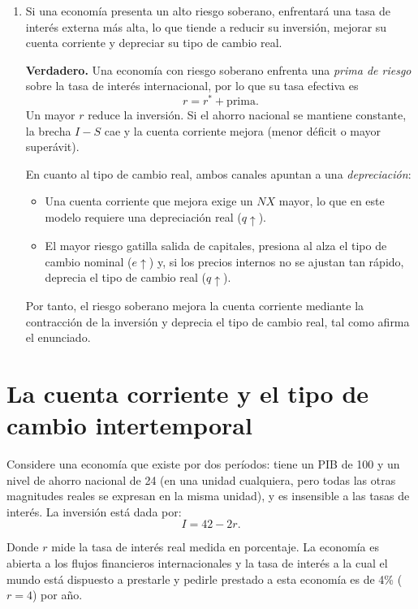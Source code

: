 \documentclass[a4paper]{article}
\begin{document}
\begin{enumerate}
    \item[f)] Si una economía presenta un alto riesgo soberano, enfrentará una tasa de interés externa más alta, lo que tiende a reducir su inversión, mejorar su cuenta corriente y depreciar su tipo de cambio real.

    \begin{solution}
        \textbf{Verdadero.} Una economía con riesgo soberano enfrenta una \textit{prima de riesgo} sobre la tasa de interés internacional, por lo que su tasa efectiva es
        \[
        r = r^* + \text{prima}.
        \]
        Un mayor \( r \) reduce la inversión. Si el ahorro nacional se mantiene constante, la brecha $I-S$ cae y la cuenta corriente mejora (menor déficit o mayor superávit).

        En cuanto al tipo de cambio real, ambos canales apuntan a una \emph{depreciación}:
        \begin{itemize}
            \item Una cuenta corriente que mejora exige un $NX$ mayor, lo que en este modelo requiere una depreciación real (\( q \uparrow \)).
            \item El mayor riesgo gatilla salida de capitales, presiona al alza el tipo de cambio nominal (\( e \uparrow \)) y, si los precios internos no se ajustan tan rápido, deprecia el tipo de cambio real (\( q \uparrow \)).
        \end{itemize}
        Por tanto, el riesgo soberano mejora la cuenta corriente mediante la contracción de la inversión y deprecia el tipo de cambio real, tal como afirma el enunciado.
    \end{solution}

\end{enumerate}

\section*{La cuenta corriente y el tipo de cambio intertemporal}

Considere una economía que existe por dos períodos: tiene un PIB de 100 y un nivel de ahorro nacional de 24 (en una unidad cualquiera, pero todas las otras magnitudes reales se expresan en la misma unidad), y es insensible a las tasas de interés. La inversión está dada por: $$I = 42 - 2r.$$

Donde $r$ mide la tasa de interés real medida en porcentaje. La economía es abierta a los flujos financieros internacionales y la tasa de interés a la cual el mundo está dispuesto a prestarle y pedirle prestado a esta economía es de 4\% ($r = 4$) por año.
\end{document}

